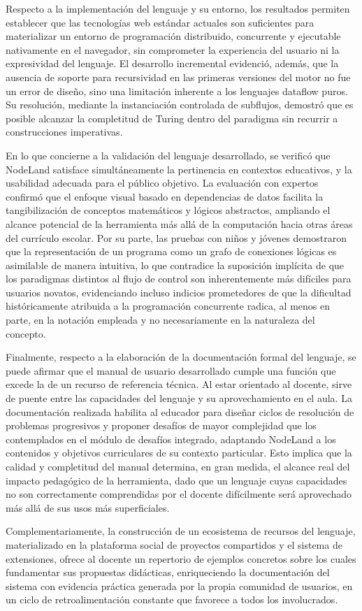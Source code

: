 Respecto a la implementación del lenguaje y su entorno, los resultados permiten establecer que las tecnologías web estándar actuales son suficientes para materializar un entorno de programación distribuido, concurrente y ejecutable nativamente en el navegador, sin comprometer la experiencia del usuario ni la expresividad del lenguaje. El desarrollo incremental evidenció, además, que la ausencia de soporte para recursividad en las primeras versiones del motor no fue un error de diseño, sino una limitación inherente a los lenguajes dataflow puros. Su resolución, mediante la instanciación controlada de subflujos, demostró que es posible alcanzar la completitud de Turing dentro del paradigma sin recurrir a construcciones imperativas.

En lo que concierne a la validación del lenguaje desarrollado, se verificó que NodeLand satisface simultáneamente la pertinencia en contextos educativos, y la usabilidad adecuada para el público objetivo. La evaluación con expertos confirmó que el enfoque visual basado en dependencias de datos facilita la tangibilización de conceptos matemáticos y lógicos abstractos, ampliando el alcance potencial de la herramienta más allá de la computación hacia otras áreas del currículo escolar. Por su parte, las pruebas con niños y jóvenes demostraron que la representación de un programa como un grafo de conexiones lógicas es asimilable de manera intuitiva, lo que contradice la suposición implícita de que los paradigmas distintos al flujo de control son inherentemente más difíciles para usuarios novatos, evidenciando incluso indicios prometedores de que la dificultad históricamente atribuida a la programación concurrente radica, al menos en parte, en la notación empleada y no necesariamente en la naturaleza del concepto.

Finalmente, respecto a la elaboración de la documentación formal del lenguaje, se puede afirmar que el manual de usuario desarrollado cumple una función que excede la de un recurso de referencia técnica. Al estar orientado al docente, sirve de puente entre las capacidades del lenguaje y su aprovechamiento en el aula. La documentación realizada habilita al educador para diseñar ciclos de resolución de problemas progresivos y proponer desafíos de mayor complejidad que los contemplados en el módulo de desafíos integrado, adaptando NodeLand a los contenidos y objetivos curriculares de su contexto particular. Esto implica que la calidad y completitud del manual determina, en gran medida, el alcance real del impacto pedagógico de la herramienta, dado que un lenguaje cuyas capacidades no son correctamente comprendidas por el docente difícilmente será aprovechado más allá de sus usos más superficiales.

Complementariamente, la construcción de un ecosistema de recursos del lenguaje, materializado en la plataforma social de proyectos compartidos y el sistema de extensiones, ofrece al docente un repertorio de ejemplos concretos sobre los cuales fundamentar sus propuestas didácticas, enriqueciendo la documentación del sistema con evidencia práctica generada por la propia comunidad de usuarios, en un ciclo de retroalimentación constante que favorece a todos los involucrados.